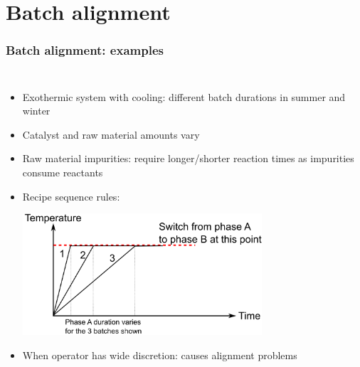 \section{Batch alignment}

\begin{frame}\frametitle{Batch alignment: examples}

\begin{columns}
	
	
		\small
		\begin{itemize}
			\item	Exothermic system with cooling: different batch durations in summer and winter

			\item	Catalyst and raw material amounts vary 

			\item	Raw material impurities: require longer/shorter reaction times as impurities consume reactants
			
			\item	Recipe sequence rules:

					\begin{center}
						\includegraphics[width=0.7\textwidth]{images/alignment-due-to-phase-switching.png}
					\end{center}

			\item	When operator has wide discretion: causes alignment problems
		\end{itemize}
		\vspace{12pt}
		
	

\end{columns}
\end{frame}
